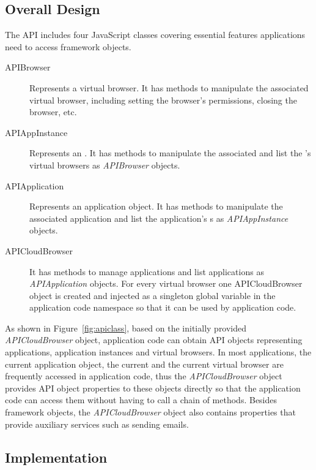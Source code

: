 \subsection{Overall Design}

The \cb API includes four JavaScript classes covering essential features 
applications need to access framework objects.

\begin{description}

\item[APIBrowser] Represents a virtual browser.
It has methods to manipulate the associated virtual browser, including
setting the browser's permissions, closing the browser, etc.

\item[APIAppInstance] Represents an \appins{}. It has methods to manipulate
the associated \appins{} and list the \appins{}'s virtual browsers as 
\emph{APIBrowser} objects.

\item[APIApplication] Represents an application object.
It has methods to manipulate the associated application
and list the application's \appins{}s as \emph{APIAppInstance} objects.

\item[APICloudBrowser]
It has methods to manage applications and list applications as \emph{APIApplication} objects.
For every virtual browser one APICloudBrowser object is created and injected as
a singleton global variable in the application code namespace so that
it can be used by application code.

\end{description}

\apiclassfig{}

As shown in Figure~\ref{fig:apiclass}, based on the initially provided
\emph{APICloudBrowser} object, application code can obtain API objects 
representing applications, application instances and virtual browsers. 
In most applications, the
current application object, the current \appins{} and the current virtual browser are
frequently accessed in application code, thus
the \emph{APICloudBrowser} object provides API object properties to 
these objects directly so that  the application code can access them without 
having to call a chain of methods. Besides framework
objects, the \emph{APICloudBrowser} object also contains properties that
provide auxiliary services such as sending emails.

\subsection{Implementation}

